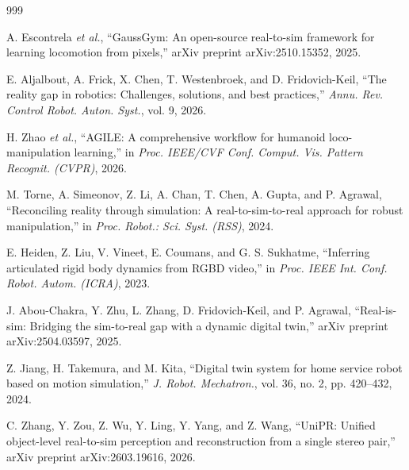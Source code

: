 \documentclass[12pt,a4paper,oneside]{report}
\begin{document}
\begin{thebibliography}{999}

A. Escontrela \textit{et al.}, ``{GaussGym}: An open-source real-to-sim framework for learning locomotion from pixels,'' arXiv preprint arXiv:2510.15352, 2025.




E. Aljalbout, A. Frick, X. Chen, T. Westenbroek, and D. Fridovich-Keil, ``The reality gap in robotics: Challenges, solutions, and best practices,'' \textit{Annu. Rev. Control Robot. Auton. Syst.}, vol. 9, 2026.




H. Zhao \textit{et al.}, ``{AGILE}: A comprehensive workflow for humanoid loco-manipulation learning,'' in \textit{Proc. IEEE/CVF Conf. Comput. Vis. Pattern Recognit. (CVPR)}, 2026.




M. Torne, A. Simeonov, Z. Li, A. Chan, T. Chen, A. Gupta, and P. Agrawal, ``Reconciling reality through simulation: A real-to-sim-to-real approach for robust manipulation,'' in \textit{Proc. Robot.: Sci. Syst. (RSS)}, 2024.




E. Heiden, Z. Liu, V. Vineet, E. Coumans, and G. S. Sukhatme, ``Inferring articulated rigid body dynamics from RGBD video,'' in \textit{Proc. IEEE Int. Conf. Robot. Autom. (ICRA)}, 2023.




J. Abou-Chakra, Y. Zhu, L. Zhang, D. Fridovich-Keil, and P. Agrawal, ``Real-is-sim: Bridging the sim-to-real gap with a dynamic digital twin,'' arXiv preprint arXiv:2504.03597, 2025.




Z. Jiang, H. Takemura, and M. Kita, ``Digital twin system for home service robot based on motion simulation,'' \textit{J. Robot. Mechatron.}, vol. 36, no. 2, pp. 420--432, 2024.




C. Zhang, Y. Zou, Z. Wu, Y. Ling, Y. Yang, and Z. Wang, ``{UniPR}: Unified object-level real-to-sim perception and reconstruction from a single stereo pair,'' arXiv preprint arXiv:2603.19616, 2026.




\end{thebibliography}
\end{document}

